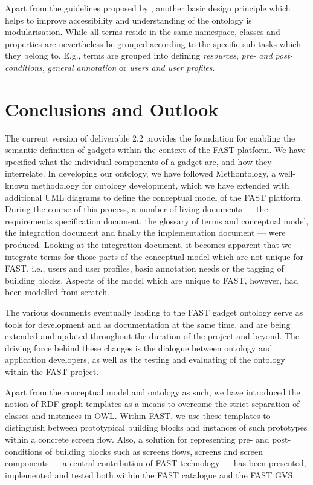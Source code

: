 \documentclass{article}
\newcommand{\todo}[1]{\textsf{\textbf{\textcolor{Orange}{[[TODO: #1]]}}}}
\newcommand{\todo}[1]{}
\begin{document}
Apart from the guidelines proposed by \cite{moeller2009ontology_soft_skills}, another basic design principle which helps to improve accessibility and understanding of the ontology is modularisation. While all terms reside in the same namespace, classes and properties are nevertheless be grouped according to the specific sub-tasks which they belong to. E.g., terms are grouped into defining \emph{resources}, \emph{pre- and post-conditions}, \emph{general annotation} or \emph{users and user profiles}. 



\clearpage
\section{Conclusions and Outlook} %
\label{sec:conclusions}

The current version of deliverable 2.2 provides the foundation for enabling the semantic definition of gadgets within the context of the FAST platform. We have specified what the individual components of a gadget are, and how they interrelate. In developing our ontology, we have followed Methontology, a well-known methodology for ontology development, which we have extended with additional UML diagrams to define the conceptual model of the FAST platform. During the course of this process, a number of living documents --- the requirements specification document, the glossary of terms and conceptual model, the integration document and finally the implementation document --- were produced. 
Looking at the integration document, it becomes apparent that we integrate terms for those parts of the conceptual model which are not unique for FAST, i.e., users and user profiles, basic annotation needs or the tagging of building blocks. Aspects of the model which are unique to FAST, however, had been modelled from scratch.

The various documents eventually leading to the FAST gadget ontology serve as tools for development and as documentation at the same time, and are being extended and updated throughout the duration of the project and beyond. The driving force behind these changes is the dialogue between ontology and application developers, as well as the testing and evaluating of the ontology within the FAST project.

Apart from the conceptual model and ontology as such, we have introduced the notion of RDF graph templates as a means to overcome the strict separation of classes and instances in OWL. Within FAST, we use these templates to distinguish between prototypical building blocks and instances of such prototypes within a concrete screen flow. Also, a solution for representing pre- and post-conditions of building blocks such as screens flows, screens and screen components --- a central contribution of FAST technology --- has been presented, implemented and tested both within the FAST catalogue and the FAST GVS.
\end{document}
